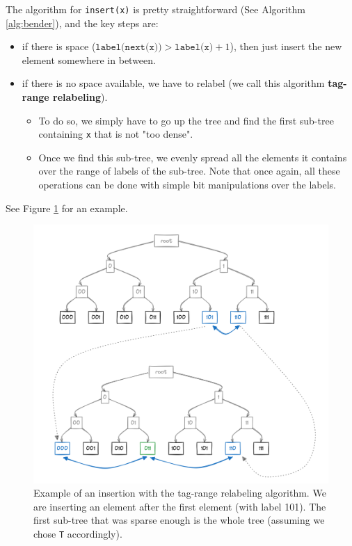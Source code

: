 \documentclass[12pt]{article}
\begin{document}
The algorithm for \texttt{insert(x)} is pretty straightforward (See Algorithm \ref{alg:bender}), and the key steps are:

\begin{itemize}
  \item if there is space ($\texttt{label(next(x))} > \texttt{label(x)} + 1$), then just insert the new element somewhere in between.
  \item if there is no space available, we have to relabel (we call this algorithm \textbf{tag-range relabeling}).
        \begin{itemize}
          \item To do so, we simply have to go up the tree and find the first sub-tree containing \texttt{x} that is not "too dense".
          \item Once we find this sub-tree, we evenly spread all the elements it contains over the range of labels of the sub-tree. Note that once again, all these operations can be done with simple bit manipulations over the labels.
        \end{itemize}
\end{itemize}

See Figure \ref{bender} for an example.

\begin{figure}[h!]
  \includegraphics[width=450px, keepaspectratio]{./bender-ex.png}
  \caption{Example of an insertion with the tag-range relabeling algorithm. We are inserting an element after the first element (with label 101). The first sub-tree that was sparse enough is the whole tree (assuming we chose \texttt{T} accordingly).}
  \label{bender}
\end{figure}
\end{document}
